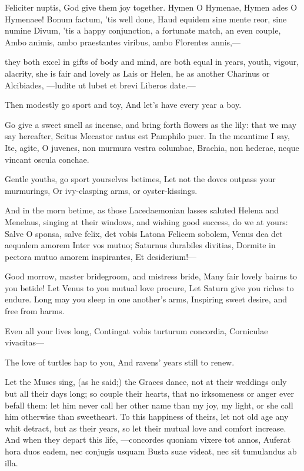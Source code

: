 Feliciter nuptis, God give them joy together. Hymen O Hymenae,
Hymen ades O Hymenaee! Bonum factum, 'tis well done, Haud equidem sine
mente reor, sine numine Divum, 'tis a happy conjunction, a fortunate
match, an even couple,
Ambo animis, ambo praestantes viribus, ambo
Florentes annis,---

they both excel in gifts of body and mind, are both equal in years,
youth, vigour, alacrity, she is fair and lovely as Lais or Helen, he as
another Charinus or Alcibiades,
---ludite ut lubet et brevi
Liberos date.---

Then modestly go sport and toy,
And let's have every year a boy.

Go give a sweet smell as incense, and bring forth flowers as the
lily: that we may say hereafter, Scitus Mecastor natus est Pamphilo
puer. In the meantime I say,
Ite, agite, O juvenes, non murmura vestra columbae,
Brachia, non hederae, neque vincant oscula conchae.

Gentle youths, go sport yourselves betimes,
Let not the doves outpass your murmurings,
Or ivy-clasping arms, or oyster-kissings.

And in the morn betime, as those Lacedaemonian lasses saluted
Helena and Menelaus, singing at their windows, and wishing good
success, do we at yours:
Salve O sponsa, salve felix, det vobis Latona
Felicem sobolem, Venus dea det aequalem amorem
Inter vos mutuo; Saturnus durabiles divitias,
Dormite in pectora mutuo amorem inspirantes,
Et desiderium!---

Good morrow, master bridegroom, and mistress bride,
Many fair lovely bairns to you betide!
Let Venus to you mutual love procure,
Let Saturn give you riches to endure.
Long may you sleep in one another's arms,
Inspiring sweet desire, and free from harms.

Even all your lives long,
Contingat vobis turturum concordia,
Corniculae vivacitas---

The love of turtles hap to you,
And ravens' years still to renew.

Let the Muses sing, (as he said;) the Graces dance, not at their
weddings only but all their days long; so couple their hearts, that no
irksomeness or anger ever befall them: let him never call her other
name than my joy, my light, or she call him otherwise than sweetheart.
To this happiness of theirs, let not old age any whit detract, but as
their years, so let their mutual love and comfort increase. And when
they depart this life,
---concordes quoniam vixere tot annos,
Auferat hora duos eadem, nec conjugis usquam
Busta suae videat, nec sit tumulandus ab illa.

